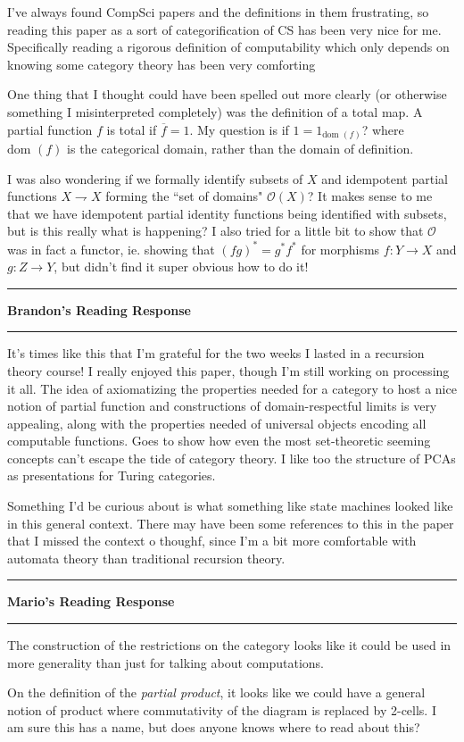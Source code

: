 \documentclass{amsart}
\newcommand{\iam}[1]{
  \vspace{0.25em}
  \hrule
  \vspace{0.25em}
  \textbf{{#1}'s Reading Response}
  \vspace{0.25em}
  \hrule
  \vspace{1em}
}
\begin{document}
I’ve always found CompSci papers and the definitions in them frustrating, so reading this paper as a sort of categorification of CS has been very nice for me. Specifically reading a rigorous definition of computability which only depends on knowing some category theory has been very comforting

One thing that I thought could have been spelled out more clearly (or otherwise something I misinterpreted completely) was the definition of a total map. A partial function $f$ is total if $\overline{f} = 1$. My question is if $1= 1_{\text{dom }(f)}$? where $\text{dom }(f)$ is the categorical domain, rather than the domain of definition.

I was also wondering if we formally identify subsets of $X$ and idempotent partial functions $X \rightharpoondown X$ forming the ``set of domains" $\mathcal{O}(X)$? It makes sense to me that we have idempotent partial identity functions being identified with subsets, but is this really what is happening? I also tried for a little bit to show that $\mathcal{O}$ was in fact a functor, ie. showing that $(fg)^* = g^* f^* $ for morphisms $f:Y \to X$ and $g: Z \to Y$, but didn’t find it super obvious how to do it!


\iam{Brandon}

It's times like this that I'm grateful for the two weeks I lasted in a recursion theory course! I really enjoyed this paper, though I'm still working on processing it all.  The idea of axiomatizing the properties needed for a category to host a nice notion of partial function and constructions of domain-respectful limits is very appealing, along with the properties needed of universal objects encoding all computable functions.  Goes to show how even the most set-theoretic seeming concepts can't escape the tide of category theory.  I like too the structure of PCAs as presentations for Turing categories.

Something I'd be curious about is what something like state machines looked like in this general context.  There may have been some references to this in the paper that I missed the context o thoughf, since I'm a bit more comfortable with automata theory than traditional recursion theory.

\iam{Mario}

The construction of the restrictions on the category looks like it
could be used in more generality than just for talking about
computations.

On the definition of the \emph{partial product}, it looks like we
could have a general notion of product where commutativity of the
diagram is replaced by 2-cells. I am sure this has a name, but does
anyone knows where to read about this?
\end{document}
